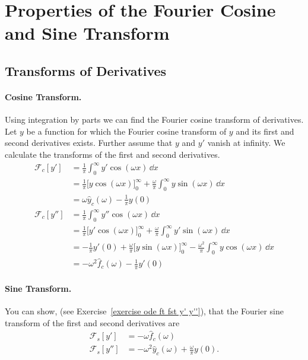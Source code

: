 \section{Properties of the Fourier Cosine and Sine Transform}






\subsection{Transforms of Derivatives}





\paragraph{Cosine Transform.}
Using integration by parts we can find the Fourier cosine transform of 
derivatives.  Let $y$ be a function for which the Fourier cosine transform
of $y$ and its first and second derivatives exists.  Further assume that
$y$ and $y'$ vanish at infinity.
We calculate the transforms of the first and second derivatives.
\begin{align*}
  \mathcal{F}_c[y'] &= \frac{1}{\pi} \int_0^\infty y' \cos(\omega x)\,\dd x 
  \\
  &= \frac{1}{\pi} \big[y \cos(\omega x)\big]_0^\infty 
  + \frac{\omega}{\pi} \int_0^\infty y \sin(\omega x)\,\dd x 
  \\
  &= \omega \hat{y}_c(\omega) - \frac{1}{\pi} y(0) 
  \\
  \mathcal{F}_c[y''] &= \frac{1}{\pi} \int_0^\infty y'' \cos(\omega x)\,\dd x 
  \\
  &= \frac{1}{\pi} \big[y' \cos(\omega x)\big]_0^\infty 
  + \frac{\omega}{\pi} \int_0^\infty y' \sin(\omega x)\,\dd x 
  \\
  &= - \frac{1}{\pi} y'(0) + \frac{\omega}{\pi}\big[y \sin(\omega x)
  \big]_0^\infty - \frac{\omega^2}{\pi} \int_0^\infty y \cos(\omega x) \,\dd x 
  \\
  &= - \omega^2 \hat{f}_c(\omega) - \frac{1}{\pi} y'(0)
\end{align*}


\paragraph{Sine Transform.}
You can show, (see Exercise~\ref{exercise ode ft fst y' y''}), that the Fourier
sine transform of the first and second derivatives are
\begin{align*}
  \mathcal{F}_s[y'] &= - \omega \hat{f}_c(\omega) 
  \\
  \mathcal{F}_s[y''] &= - \omega^2 \hat{y}_c(\omega) + \frac{\omega}{\pi} y(0).
\end{align*}












